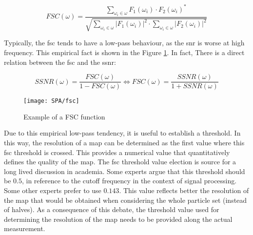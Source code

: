 \documentclass[../main.tex]{subfiles}
\begin{document}
\begin{equation}\label{eq:3:fsc}
    FSC(\omega) =   \frac{
                        \sum_{\omega_i \in \omega} F_1(\omega_i) \cdot F_2(\omega_i)^*
                    }{
                        \sqrt{\sum_{\omega_i \in \omega} |F_1(\omega_i)|^2 \cdot \sum_{\omega_i \in \omega} |F_2(\omega_i)|^2}
                    }
\end{equation}

Typically, the \gls{fsc} tends to have a low-pass behaviour, as the \gls{snr} is worse at high frequency. This empirical fact is shown in the Figure \ref{fig:3:fsc}.  In fact, There is a direct relation between the \gls{fsc} and the \gls{ssnr}:

\begin{equation}\label{eq:3:ssnr}
    SSNR(\omega) = \frac{FSC(\omega)}{1 - FSC(\omega)} \Leftrightarrow FSC(\omega) = \frac{SSNR(\omega)}{1 + SSNR(\omega)}
\end{equation}

\begin{figure}[htbp]
    \centering
    \texttt{[image: SPA/fsc]}
    \caption{Example of a FSC function}
    \label{fig:3:fsc}
\end{figure}

Due to this empirical low-pass tendency, it is useful to establish a threshold. In this way, the resolution of a map can be determined as the first value where this \gls{fsc} threshold is crossed. This provides a numerical value that quantitatively defines the quality of the map. The \gls{fsc} threshold value election is source for a long lived discussion in academia. Some experts argue that this threshold should be $0.5$, in reference to the cutoff frequency in the context of signal processing. Some other experts prefer to use $0.143$. This value reflects better the resolution of the map that would be obtained when considering the whole particle set (instead of halves)\cite{chen2013}. As a consequence of this debate, the threshold value used for determining the resolution of the map needs to be provided along the actual measurement.
\end{document}
